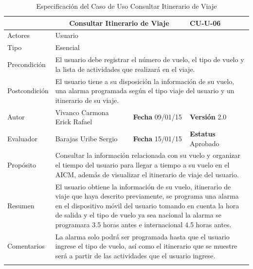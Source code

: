 \begin{longtable}{|p{2.5cm}|p{6.4cm}|p{2cm}|p{2cm}|}
	\hline
		\rowcolor[RGB]{51,153,255}{Caso de Uso}&\multicolumn{2}{c}{Consultar Itinerario de Viaje}&{\textbf{CU-U-06}}\\
	\hline
		{Actores}&\multicolumn{3}{p{11.2cm}|}{Usuario}\\
	\hline
		{Tipo}&\multicolumn{3}{p{11.2cm}|}{Esencial}\\
	\hline
		{Precondición}&\multicolumn{3}{p{11.2cm}|}{El usuario debe registrar el número de vuelo, el tipo de vuelo y la lista de actividades que realizará en el viaje.}\\
	\hline
		{Postcondición}&\multicolumn{3}{p{11.2cm}|}{El usuario tiene a su disposición la información de su vuelo, una alarma programada según el tipo viaje del usuario y un itinerario de su viaje.}\\
	\hline
		{Autor}&{Vivanco Carmona Erick Rafael}&{\textbf{Fecha} 09/01/15}&{\textbf{Versión} 2.0}\\
			\hline
		{Evaluador}&{Barajas Uribe Sergio}&{\textbf{Fecha} 15/01/15}&{\textbf{Estatus} Aprobado}\\
	\hline
		{Propósito}&\multicolumn{3}{p{11.2cm}|}{Consultar la información relacionada con su vuelo y organizar el tiempo del usuario para llegar a tiempo a su vuelo en el AICM, además de visualizar el itinerario de viaje del usuario.}\\
	\hline
		{Resumen}&\multicolumn{3}{p{11.2cm}|}{El usuario obtiene la información de su vuelo, itinerario de viaje que haya descrito previamente, se programa una alarma en el dispositivo móvil del usuario tomando en cuenta la hora de salida y el tipo de vuelo ya sea nacional la alarma se programara 3.5 horas antes e internacional 4.5 horas antes.}\\	
	\hline
		{Comentarios}&\multicolumn{3}{p{11.2cm}|}{La alarma solo podrá ser programada hasta que el usuario ingrese el tipo de vuelo, así como el itinerario que se muestre será a partir de las actividades que el usuario ingrese.}\\	
	\hline
	\caption[Especificación del Caso de Uso Consultar Itinerario de Viaje]{Especificación del Caso de Uso Consultar Itinerario de Viaje}
    	\label{tab:cuConsultarItinerarioViaje}
\end{longtable}
\newpage
